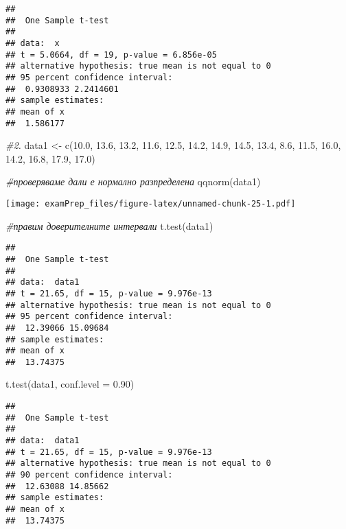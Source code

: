 \documentclass[
]{article}
\newenvironment{Shaded}{\begin{snugshade}}{\end{snugshade}}
\newcommand{\AttributeTok}[1]{\textcolor[rgb]{0.77,0.63,0.00}{#1}}
\newcommand{\CommentTok}[1]{\textcolor[rgb]{0.56,0.35,0.01}{\textit{#1}}}
\newcommand{\FloatTok}[1]{\textcolor[rgb]{0.00,0.00,0.81}{#1}}
\newcommand{\FunctionTok}[1]{\textcolor[rgb]{0.00,0.00,0.00}{#1}}
\newcommand{\NormalTok}[1]{#1}
\newcommand{\OtherTok}[1]{\textcolor[rgb]{0.56,0.35,0.01}{#1}}
\begin{document}
\begin{verbatim}
## 
##  One Sample t-test
## 
## data:  x
## t = 5.0664, df = 19, p-value = 6.856e-05
## alternative hypothesis: true mean is not equal to 0
## 95 percent confidence interval:
##  0.9308933 2.2414601
## sample estimates:
## mean of x 
##  1.586177
\end{verbatim}

\begin{Shaded}
\begin{Highlighting}[]
\CommentTok{\#2.}
\NormalTok{data1 }\OtherTok{\textless{}{-}} \FunctionTok{c}\NormalTok{(}\FloatTok{10.0}\NormalTok{, }\FloatTok{13.6}\NormalTok{, }\FloatTok{13.2}\NormalTok{, }\FloatTok{11.6}\NormalTok{, }\FloatTok{12.5}\NormalTok{, }\FloatTok{14.2}\NormalTok{, }\FloatTok{14.9}\NormalTok{, }\FloatTok{14.5}\NormalTok{, }\FloatTok{13.4}\NormalTok{, }\FloatTok{8.6}\NormalTok{, }\FloatTok{11.5}\NormalTok{, }\FloatTok{16.0}\NormalTok{, }\FloatTok{14.2}\NormalTok{, }\FloatTok{16.8}\NormalTok{, }\FloatTok{17.9}\NormalTok{, }\FloatTok{17.0}\NormalTok{)}

\CommentTok{\#проверяваме дали е нормално разпределена}
\FunctionTok{qqnorm}\NormalTok{(data1)}
\end{Highlighting}
\end{Shaded}

\texttt{[image: examPrep\_files/figure-latex/unnamed-chunk-25-1.pdf]}

\begin{Shaded}
\begin{Highlighting}[]
\CommentTok{\#правим доверителните интервали}
\FunctionTok{t.test}\NormalTok{(data1)}
\end{Highlighting}
\end{Shaded}

\begin{verbatim}
## 
##  One Sample t-test
## 
## data:  data1
## t = 21.65, df = 15, p-value = 9.976e-13
## alternative hypothesis: true mean is not equal to 0
## 95 percent confidence interval:
##  12.39066 15.09684
## sample estimates:
## mean of x 
##  13.74375
\end{verbatim}

\begin{Shaded}
\begin{Highlighting}[]
\FunctionTok{t.test}\NormalTok{(data1, }\AttributeTok{conf.level =} \FloatTok{0.90}\NormalTok{)}
\end{Highlighting}
\end{Shaded}

\begin{verbatim}
## 
##  One Sample t-test
## 
## data:  data1
## t = 21.65, df = 15, p-value = 9.976e-13
## alternative hypothesis: true mean is not equal to 0
## 90 percent confidence interval:
##  12.63088 14.85662
## sample estimates:
## mean of x 
##  13.74375
\end{verbatim}
\end{document}
